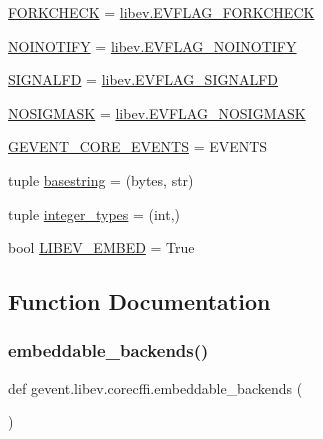 \begin{DoxyCompactItemize}
\item 
\hyperlink{namespacegevent_1_1libev_1_1corecffi_ab3188995f83a241d17f4e9d2d6365b48}{F\+O\+R\+K\+C\+H\+E\+CK} = \hyperlink{libev_2__corecffi__cdef_8c_a1b60a7484ca25116ef6fd3b8c7fa71ad}{libev.\+E\+V\+F\+L\+A\+G\+\_\+\+F\+O\+R\+K\+C\+H\+E\+CK}
\item 
\hyperlink{namespacegevent_1_1libev_1_1corecffi_a88f581cd97878fb5a55c9dba47b80deb}{N\+O\+I\+N\+O\+T\+I\+FY} = \hyperlink{libev_2__corecffi__cdef_8c_ab8af6b463efac0d9661dad6d35eabdc5}{libev.\+E\+V\+F\+L\+A\+G\+\_\+\+N\+O\+I\+N\+O\+T\+I\+FY}
\item 
\hyperlink{namespacegevent_1_1libev_1_1corecffi_a8e3202dcd19898d82453dbe0f118d2ab}{S\+I\+G\+N\+A\+L\+FD} = \hyperlink{libev_2__corecffi__cdef_8c_a7056f2482366090642066a8d40de5cf9}{libev.\+E\+V\+F\+L\+A\+G\+\_\+\+S\+I\+G\+N\+A\+L\+FD}
\item 
\hyperlink{namespacegevent_1_1libev_1_1corecffi_a7ffb44e874f59834da53e52579c5aab9}{N\+O\+S\+I\+G\+M\+A\+SK} = \hyperlink{libev_2__corecffi__cdef_8c_a07239be04f51dba5bdadf96c42f1eeea}{libev.\+E\+V\+F\+L\+A\+G\+\_\+\+N\+O\+S\+I\+G\+M\+A\+SK}
\item 
\hyperlink{namespacegevent_1_1libev_1_1corecffi_aad581c0dcecf234213aef39c829b19a2}{G\+E\+V\+E\+N\+T\+\_\+\+C\+O\+R\+E\+\_\+\+E\+V\+E\+N\+TS} = E\+V\+E\+N\+TS
\item 
tuple \hyperlink{namespacegevent_1_1libev_1_1corecffi_a827e73c6a7e69a3d86909e31e0c0ce3f}{basestring} = (bytes, str)
\item 
tuple \hyperlink{namespacegevent_1_1libev_1_1corecffi_a0eb53c9e3313f9bbe9ae38b38e8f2333}{integer\+\_\+types} = (int,)
\item 
bool \hyperlink{namespacegevent_1_1libev_1_1corecffi_a807f056f99d2a8a403cd4000405f7173}{L\+I\+B\+E\+V\+\_\+\+E\+M\+B\+ED} = True
\end{DoxyCompactItemize}


\subsection{Function Documentation}
\mbox{\label{namespacegevent_1_1libev_1_1corecffi_a01a4e8376ed921292b38f40aecbb50db}} 
\subsubsection{\texorpdfstring{embeddable\+\_\+backends()}{embeddable\_backends()}}
{\footnotesize\ttfamily def gevent.\+libev.\+corecffi.\+embeddable\+\_\+backends (\begin{DoxyParamCaption}{ }\end{DoxyParamCaption})}

